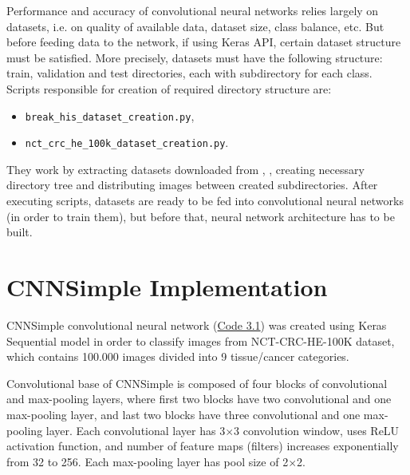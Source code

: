 Performance and accuracy of convolutional neural networks relies largely on datasets, i.e. on quality of available data, dataset size, class balance, etc. But before feeding data to the network, if using Keras API, certain dataset structure must be satisfied. More precisely, datasets must have the following structure: train, validation and test directories, each with subdirectory for each class. Scripts responsible for creation of required directory structure are:
\begin{itemize}
	\itemsep 0em
	\item \texttt{break\_his\_dataset\_creation.py},
	\item \texttt{nct\_crc\_he\_100k\_dataset\_creation.py}.
\end{itemize} 
They work by extracting datasets downloaded from \cite{breakhis_bib}, \cite{nctcrche100k_bib}, creating necessary directory tree and distributing images between created subdirectories. After executing scripts, datasets are ready to be fed into convolutional neural networks (in order to train them), but before that, neural network architecture has to be built.
\clearpage

\section{CNNSimple Implementation}
\label{cnn}

CNNSimple convolutional neural network (\textcolor{red}{\hyperref[src:py1]{Code 3.1}}) was created using Keras Sequential model in order to classify images from NCT-CRC-HE-100K dataset, which contains 100.000 images divided into 9 tissue/cancer categories. 

Convolutional base of CNNSimple is composed of four blocks of convolutional and max-pooling layers, where first two blocks have two convolutional and one max-pooling layer, and last two blocks have three convolutional and one max-pooling layer. Each convolutional layer has 3$\times$3 convolution window, uses ReLU activation function, and number of feature maps (filters) increases exponentially from 32 to 256. Each max-pooling layer has pool size of 2$\times$2. 

